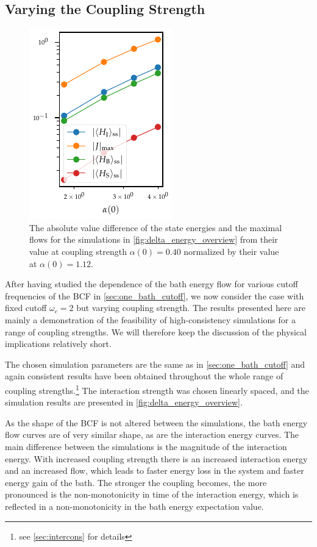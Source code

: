 \subsection{Varying the Coupling Strength}%
\label{sec:one_bathcoup_strength}
\begin{figure}[htp]
  \centering
  \includegraphics{figs/one_bath_syst/final_states_flows}
  \caption{\label{fig:delta_fs_flow} The absolute value difference of
    the state energies and the maximal flows for the simulations in
    \cref{fig:delta_energy_overview} from their value at coupling
    strength \(α(0)=0.40\) normalized by their value at
    \(α(0)=1.12\).}
\end{figure}
After having studied the dependence of the bath energy flow for
various cutoff frequencies of the BCF in \cref{sec:one_bath_cutoff},
we now consider the case with fixed cutoff \(ω_c=2\) but varying
coupling strength. The results presented here are mainly a
demonstration of the feasibility of high-consistency simulations for a
range of coupling strengths. We will therefore keep the discussion of
the physical implications relatively short.

The chosen simulation parameters are the same as in
\cref{sec:one_bath_cutoff} and again consistent results have been
obtained throughout the whole range of coupling
strengths.\footnote{see \cref{sec:intercons} for details} The
interaction strength was chosen linearly spaced, and the simulation
results are presented in \cref{fig:delta_energy_overview}.

As the shape of the BCF is not altered between the simulations, the
bath energy flow curves are of very similar shape, as are the
interaction energy curves. The main difference between the simulations
is the magnitude of the interaction energy. With increased coupling
strength there is an increased interaction energy and an increased
flow, which leads to faster energy loss in the system and faster
energy gain of the bath. The stronger the coupling becomes, the more
pronounced is the non-monotonicity in time of the interaction energy,
which is reflected in a non-monotonicity in the bath energy
expectation value.


